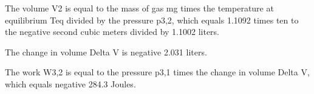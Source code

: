 The volume V2 is equal to the mass of gas mg times the temperature at equilibrium Teq divided by the pressure p3,2, which equals 1.1092 times ten to the negative second cubic meters divided by 1.1002 liters.

The change in volume Delta V is negative 2.031 liters.

The work W3,2 is equal to the pressure p3,1 times the change in volume Delta V, which equals negative 284.3 Joules.